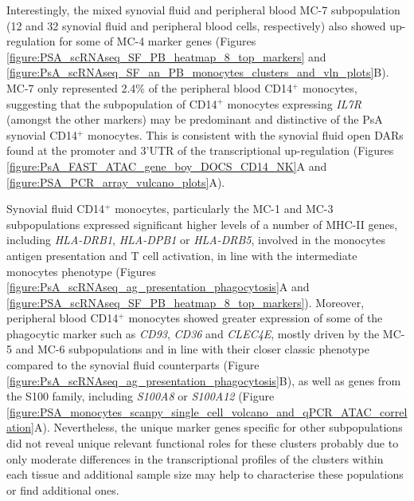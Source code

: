 Interestingly, the mixed synovial fluid and peripheral blood MC-7 subpopulation (12 and 32 synovial fluid and peripheral blood cells, respectively) also showed up-regulation for some of MC-4 marker genes (Figures \ref{figure:PSA_scRNAseq_SF_PB_heatmap_8_top_markers} and \ref{figure:PsA_scRNAseq_SF_an_PB_monocytes_clusters_and_vln_plots}B). MC-7 only represented 2.4\% of the peripheral blood CD14$^+$ monocytes, suggesting that the subpopulation of CD14$^+$ monocytes expressing \textit{IL7R} (amongst the other markers) may be predominant and distinctive of the PsA synovial CD14$^+$ monocytes. This is consistent with the synovial fluid open DARs found at the promoter and 3'UTR of the transcriptional up-regulation (Figures \ref{figure:PsA_FAST_ATAC_gene_boy_DOCS_CD14_NK}A and \ref{figure:PSA_PCR_array_vulcano_plots}A).


Synovial fluid CD14$^+$ monocytes, particularly the MC-1 and MC-3 subpopulations expressed significant higher levels of a number of MHC-II genes, including  \textit{HLA-DRB1}, \textit{HLA-DPB1} or \textit{HLA-DRB5}, involved in the monocytes antigen presentation and T cell activation, in line with the intermediate monocytes phenotype (Figures \ref{figure:PsA_scRNAseq_ag_presentation_phagocytosis}A and \ref{figure:PSA_scRNAseq_SF_PB_heatmap_8_top_markers}). Moreover, peripheral blood CD14$^+$ monocytes showed greater expression of some of the phagocytic marker such as \textit{CD93}, \textit{CD36} and \textit{CLEC4E}, mostly driven by the MC-5 and MC-6 subpopulations and in line with their closer classic phenotype compared to the synovial fluid counterparts (Figure \ref{figure:PsA_scRNAseq_ag_presentation_phagocytosis}B), as well as genes from the S100 family, including \textit{S100A8} or \textit{S100A12} (Figure \ref{figure:PSA_monocytes_scanpy_single_cell_volcano_and_qPCR_ATAC_correlation}A). Nevertheless, the unique marker genes specific for other subpopulations did not reveal unique relevant functional roles for these clusters probably due to only moderate differences in the transcriptional profiles of the clusters within each tissue and additional sample size may help to characterise these populations or find additional ones.


